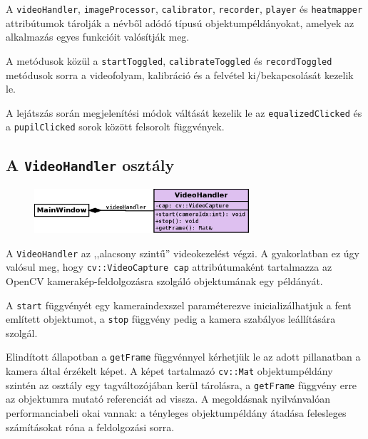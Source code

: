 A \texttt{videoHandler}, \texttt{imageProcessor}, \texttt{calibrator}, \texttt{recorder}, \texttt{player} és \texttt{heatmapper} attribútumok tárolják a névből adódó típusú objektumpéldányokat, amelyek az alkalmazás egyes funkcióit valósítják meg.

A metódusok közül a \texttt{startToggled}, \texttt{calibrateToggled} és \texttt{recordToggled} metódusok sorra a videofolyam, kalibráció és a felvétel ki/bekapcsolását kezelik le.

A lejátszás során megjelenítési módok váltását kezelik le az \texttt{equalizedClicked} és a \texttt{pupilClicked} sorok között felsorolt függvények.

\subsection{A \texttt{VideoHandler} osztály}\label{sect:videohandler}

\begin{figure}[!ht]
\centering
\includegraphics[width=80mm, keepaspectratio]{figures/class_videohandler.png}
\end{figure}

A \texttt{VideoHandler} az ,,alacsony szintű'' videokezelést végzi. A gyakorlatban ez úgy valósul meg, hogy \texttt{cv::VideoCapture cap} attribútumaként tartalmazza az OpenCV kamerakép-feldolgozásra szolgáló objektumának egy példányát.

A \texttt{start} függvényét egy kameraindexszel paraméterezve inicializálhatjuk a fent említett objektumot, a \texttt{stop} függvény pedig a kamera szabályos leállítására szolgál.

Elindított állapotban a \texttt{getFrame} függvénnyel kérhetjük le az adott pillanatban a kamera által érzékelt képet. A képet tartalmazó \texttt{cv::Mat} objektumpéldány szintén az osztály egy tagváltozójában kerül tárolásra, a \texttt{getFrame} függvény erre az objektumra mutató referenciát ad vissza. A megoldásnak nyilvánvalóan performanciabeli okai vannak: a tényleges objektumpéldány átadása felesleges számításokat róna a feldolgozási sorra.

